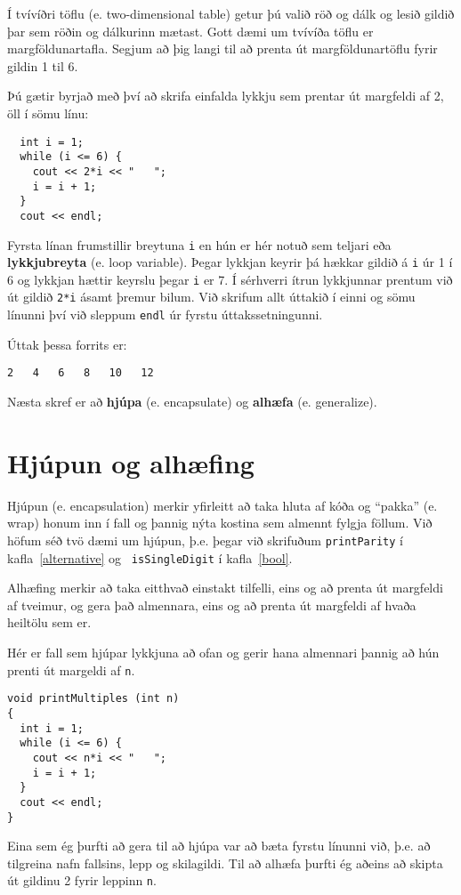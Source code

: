 Í tvívíðri töflu (e. two-dimensional table) getur þú valið röð og dálk og lesið gildið þar sem röðin og dálkurinn mætast.
Gott dæmi um tvívíða töflu er margföldunartafla.
Segjum að þig langi til að prenta út margföldunartöflu fyrir gildin 1 til 6.

Þú gætir byrjað með því að skrifa einfalda lykkju sem prentar út margfeldi af 2, öll í sömu línu:

\begin{verbatim}
  int i = 1;
  while (i <= 6) {
    cout << 2*i << "   ";
    i = i + 1;
  }
  cout << endl;
\end{verbatim}
%
Fyrsta línan frumstillir breytuna {\tt i} en hún er hér notuð sem teljari eða {\bf lykkjubreyta} (e. loop variable).
Þegar lykkjan keyrir þá hækkar gildið á {\tt i} úr 1 í 6 og lykkjan hættir keyrslu þegar {\tt i} er 7.
Í sérhverri ítrun lykkjunnar prentum við út gildið {\tt 2*i} ásamt þremur bilum.
Við skrifum allt úttakið í einni og sömu línunni því við sleppum {\tt endl} úr fyrstu úttakssetningunni.


Úttak þessa forrits er:

\begin{verbatim}
2   4   6   8   10   12
\end{verbatim}
%
Næsta skref er að {\bf hjúpa} (e. encapsulate) og {\bf alhæfa} (e. generalize).

\section {Hjúpun og alhæfing}

Hjúpun (e. encapsulation) merkir yfirleitt að taka hluta af kóða og ``pakka'' (e. wrap) honum inn í fall og þannig nýta kostina sem almennt fylgja föllum.
Við höfum séð tvö dæmi um hjúpun, þ.e. þegar við skrifuðum {\tt printParity} í kafla~\ref{alternative} og {\tt
isSingleDigit} í kafla~\ref{bool}.

Alhæfing merkir að taka eitthvað einstakt tilfelli, eins og að prenta út margfeldi af tveimur, og gera það almennara, eins og að prenta út margfeldi af hvaða heiltölu sem er.


Hér er fall sem hjúpar lykkjuna að ofan og gerir hana almennari þannig að hún prenti út margeldi af {\tt n}.

\begin{verbatim}
void printMultiples (int n)
{
  int i = 1;
  while (i <= 6) {
    cout << n*i << "   ";
    i = i + 1;
  }
  cout << endl;
}
\end{verbatim}
%
Eina sem ég þurfti að gera til að hjúpa var að bæta fyrstu línunni við, þ.e. að tilgreina nafn fallsins, lepp og skilagildi.
Til að alhæfa þurfti ég aðeins að skipta út gildinu 2 fyrir leppinn {\tt n}.

